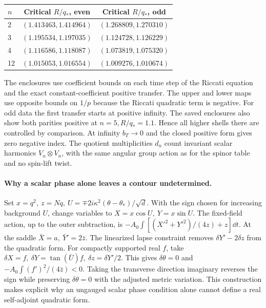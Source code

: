 \begin{center}
\begin{tabular}{lcc}
\toprule $n$ & Critical $R/q_*$, even & Critical $R/q_*$, odd\\\midrule
2 & $(1.413463,1.414964)$ & $(1.268809,1.270310)$\\
3 & $(1.195534,1.197035)$ & $(1.124728,1.126229)$\\
4 & $(1.116586,1.118087)$ & $(1.073819,1.075320)$\\
12 & $(1.015053,1.016554)$ & $(1.009276,1.010674)$\\
\bottomrule
\end{tabular}
\end{center}
The enclosures use coefficient bounds on each time step of the Riccati equation and the exact constant-coefficient positive transfer. The upper and lower maps use opposite bounds on $1/p$ because the Riccati quadratic term is negative. For odd data the first transfer starts at positive infinity. The saved enclosures also show both parities positive at $n=5,R/q_*=1.1$. Hence all higher shells there are controlled by comparison. At infinity $b_T\to0$ and the closed positive form gives zero negative index. The quotient multiplicities $d_n$ count invariant scalar harmonics $V_n\otimes V_n$, with the same angular group action as for the spinor table and no spin-lift twist.

\paragraph{Why a scalar phase alone leaves a contour undetermined.}
Set $x=q^2,\ z=Nq,\ U=\mp 2i\kappa^2(\theta-\theta_*)/\sqrt d$. With the sign chosen for increasing background $U$, change variables to $X=x\cos U,\ Y=x\sin U$. The fixed-field action, up to the outer subtraction, is $-A_0\int[(X'^2+Y'^2)/(4z)+z]\dd t$. At the saddle $\bar X=a,\ \bar Y'=2\bar z$. The linearized lapse constraint removes $\delta Y'-2\delta z$ from the quadratic form. For compactly supported real $f$, take $\delta X=f,\ \delta Y=\tan(\bar U) f,\ \delta z=\delta Y'/2$. This gives $\delta\theta=0$ and $-A_0\int(f')^2/(4\bar z)<0$. Taking the transverse direction imaginary reverses the sign while preserving $\delta\theta=0$ with the adjusted metric variation. This construction makes explicit why an ungauged scalar phase condition alone cannot define a real self-adjoint quadratic form.

